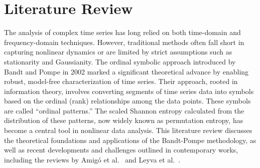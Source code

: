 \chapter{Literature Review}\label{C:lit}

The analysis of complex time series has long relied on both time-domain and frequency-domain techniques. 
However, traditional methods often fall short in capturing nonlinear dynamics or are limited by strict assumptions such as stationarity and Gaussianity. 
The ordinal symbolic approach introduced by Bandt and Pompe in 2002 marked a significant theoretical advance by enabling robust, model-free characterization of time series. 
Their approach, rooted in information theory, involves converting segments of time series data into symbols based on the ordinal (rank) relationships among the data points.
These symbols are called ``ordinal patterns.''
The scaled Shannon entropy calculated from the distribution of these patterns, now widely known as permutation entropy, has become a central tool in nonlinear data analysis. 
This literature review discusses the theoretical foundations and applications of the Bandt-Pompe methodology, as well as recent developments and challenges outlined in contemporary works, including the reviews by Amigó et al.~\cite{amigo2023ordinal} and Leyva et al.~\cite{Leyva2022}.


